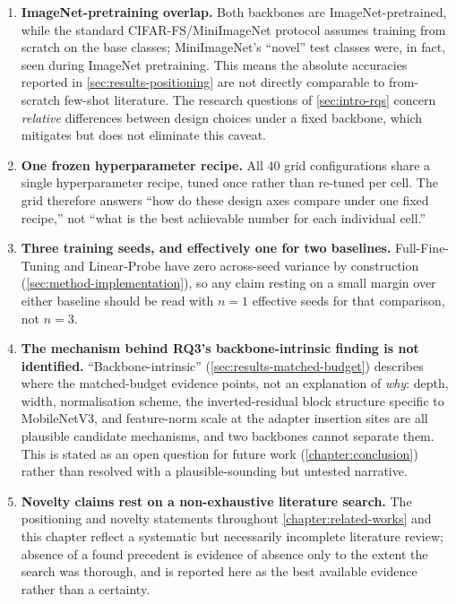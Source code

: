 \documentclass{iutbscthesis}
\begin{document}
\begin{enumerate}
    \item \textbf{ImageNet-pretraining overlap.} Both backbones are ImageNet-pretrained, while the standard CIFAR-FS/MiniImageNet protocol assumes training from scratch on the base classes; MiniImageNet's ``novel'' test classes were, in fact, seen during ImageNet pretraining. This means the absolute accuracies reported in \autoref{sec:results-positioning} are not directly comparable to from-scratch few-shot literature. The research questions of \autoref{sec:intro-rqs} concern \emph{relative} differences between design choices under a fixed backbone, which mitigates but does not eliminate this caveat.
    \item \textbf{One frozen hyperparameter recipe.} All 40 grid configurations share a single hyperparameter recipe, tuned once rather than re-tuned per cell. The grid therefore answers ``how do these design axes compare under one fixed recipe,'' not ``what is the best achievable number for each individual cell.''
    \item \textbf{Three training seeds, and effectively one for two baselines.} Full-Fine-Tuning and Linear-Probe have zero across-seed variance by construction (\autoref{sec:method-implementation}), so any claim resting on a small margin over either baseline should be read with $n=1$ effective seeds for that comparison, not $n=3$.
    \item \textbf{The mechanism behind RQ3's backbone-intrinsic finding is not identified.} ``Backbone-intrinsic'' (\autoref{sec:results-matched-budget}) describes where the matched-budget evidence points, not an explanation of \emph{why}: depth, width, normalisation scheme, the inverted-residual block structure specific to MobileNetV3, and feature-norm scale at the adapter insertion sites are all plausible candidate mechanisms, and two backbones cannot separate them. This is stated as an open question for future work (\autoref{chapter:conclusion}) rather than resolved with a plausible-sounding but untested narrative.
    \item \textbf{Novelty claims rest on a non-exhaustive literature search.} The positioning and novelty statements throughout \autoref{chapter:related-works} and this chapter reflect a systematic but necessarily incomplete literature review; absence of a found precedent is evidence of absence only to the extent the search was thorough, and is reported here as the best available evidence rather than a certainty.
\end{enumerate}
\end{document}
